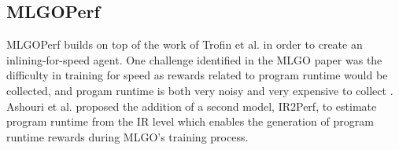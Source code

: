 \documentclass[nohyperref]{article}
\theoremstyle{plain}
\theoremstyle{definition}
\theoremstyle{remark}
\begin{document}






\subsection{MLGOPerf}
MLGOPerf \cite{mlgoperf} builds on top of the work of Trofin et al. in order to create an inlining-for-speed agent. One challenge identified in the MLGO paper was the difficulty in training for speed as rewards related to program runtime would be collected, and progam runtime is both very noisy and very expensive to collect \cite{mlgo}. Ashouri et al. proposed the addition of a second model, IR2Perf, to estimate program runtime from the IR level which enables the generation of program runtime rewards during MLGO's training process.
\end{document}

